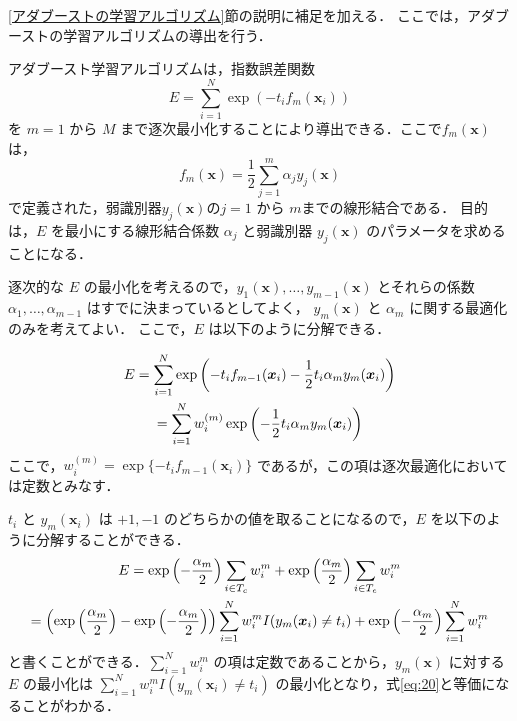 \documentclass[dvipdfmx]{jreport}
\begin{document}
\ref{アダブーストの学習アルゴリズム}節の説明に補足を加える．
ここでは，アダブーストの学習アルゴリズムの導出を行う．

アダブースト学習アルゴリズムは，指数誤差関数
\begin{equation}
E = \sum_{i=1}^{N} \exp\left(-t_i f_m(\bm{x}_i)\right)\label{eq:26}
\end{equation}
を $m = 1$ から $M$ まで逐次最小化することにより導出できる．ここで$f_m(\bm{x})$ は，
\begin{equation}
f_m(\bm{x}) = \frac{1}{2} \sum_{j=1}^{m} \alpha_j y_j(\bm{x})\label{eq:27}
\end{equation}
で定義された，弱識別器$y_j(\bm{x})$の$j = 1$ から $m$までの線形結合である．
目的は，$E$ を最小にする線形結合係数 $\alpha_j$ と弱識別器 $y_j(\bm{x})$ のパラメータを求めることになる．

逐次的な $E$ の最小化を考えるので，$y_1(\bm{x}), \ldots, y_{m-1}(\bm{x})$ とそれらの係数 $\alpha_1, \ldots, \alpha_{m-1}$ はすでに決まっているとしてよく，
$y_m(\bm{x})$ と $\alpha_m$ に関する最適化のみを考えてよい．
ここで，$E$ は以下のように分解できる．

\begin{gather}
E = \sum_{i=1}^{N} \exp\left(-t_i f_{m-1}(\bm{x}_i) - \frac{1}{2} t_i \alpha_m y_m(\bm{x}_i)\right)\notag \\
= \sum_{i=1}^{N} w_i^{(m)} \exp\left(-\frac{1}{2} t_i \alpha_m y_m(\bm{x}_i)\right)\label{eq:28}
\end{gather}
ここで，$w_i^{(m)} = \exp\{-t_i f_{m-1}(\bm{x}_i)\}$ であるが，この項は逐次最適化においては定数とみなす．

$t_i$ と $y_m(\bm{x}_i)$ は $+1, -1$ のどちらかの値を取ることになるので，$E$ を以下のように分解することができる．
\begin{gather}
E = \exp\left(-\frac{\alpha_m}{2}\right) \sum_{i \in T_c} w_i^{m} + \exp\left(\frac{\alpha_m}{2}\right) \sum_{i \in T_e} w_i^{m} \notag \\
=\left(\exp\left(\frac{\alpha_m}{2}\right) - \exp\left(-\frac{\alpha_m}{2}\right)\right) \sum_{i = 1}^N w_i^m I(y_m(\bm{x}_i) \neq t_i) + \exp\left(-\frac{\alpha_m}{2}\right) \sum_{i=1}^N w_i^m \label{eq:29}
\end{gather}
と書くことができる．$\sum_{i=1}^N w_i^m$ の項は定数であることから，$y_m(\bm{x})$ に対する $E$ の最小化は $\sum_{i = 1}^N w_i^m I(y_m(\bm{x}_i) \neq t_i)$ の最小化となり，式\eqref{eq:20}と等価になることがわかる．
\end{document}
